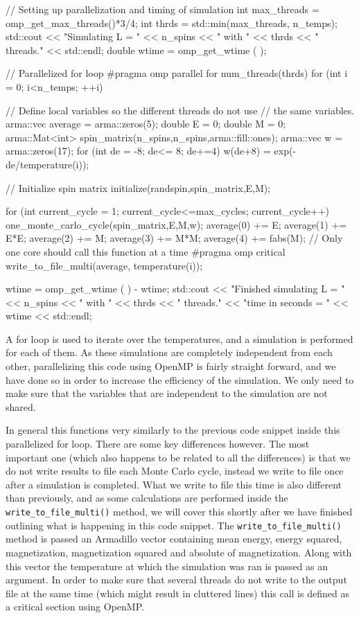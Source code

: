 \documentclass[reprint,english,notitlepage]{revtex4-1}  %
\begin{document}
\begin{cpp}
// Setting up parallelization and timing of simulation
int max_threads = omp_get_max_threads()*3/4;
int thrds = std::min(max_threads, n_temps);
std::cout << "Simulating L = " << n_spins << " with " 
		  << thrds << " threads." << std::endl;
double wtime = omp_get_wtime ( );

// Parallelized for loop
#pragma omp parallel for num_threads(thrds)
for (int i = 0; i<n_temps; ++i) {
  // Define local variables so the different threads do not use 
  // the same variables.
  arma::vec average = arma::zeros(5);
  double E = 0;
  double M = 0;
  arma::Mat<int> spin_matrix(n_spins,n_spins,arma::fill::ones);
  arma::vec w = arma::zeros(17);
  for (int de = -8; de<= 8; de+=4) {
    w(de+8) = exp(-de/temperature(i));
  }

  // Initialize spin matrix
  initialize(randspin,spin_matrix,E,M);

  for (int current_cycle = 1; current_cycle<=max_cycles; 
  	   current_cycle++){
    one_monte_carlo_cycle(spin_matrix,E,M,w);
    average(0) += E;
    average(1) += E*E;
    average(2) += M;
    average(3) += M*M;
    average(4) += fabs(M);
  }
  // Only one core should call this function at a time
  #pragma omp critical
  write_to_file_multi(average, temperature(i));
}
wtime = omp_get_wtime ( ) - wtime;
std::cout << "Finished simulating L = " << n_spins << " with " 
	      << thrds << " threads."
  		  << "\nElapsed time in seconds = " << wtime << std::endl;
\end{cpp} 

A for loop is used to iterate over the temperatures, and a simulation is performed for each of them. As these simulations are completely independent from each other, parallelizing this code using OpenMP is fairly straight forward, and we have done so in order to increase the efficiency of the simulation. We only need to make sure that the variables that are independent to the simulation are not shared. 

In general this functions very similarly to the previous code snippet inside this parallelized for loop. There are some key differences however. The most important one (which also happens to be related to all the differences) is that we do not write results to file each Monte Carlo cycle, instead we write to file once after a simulation is completed. What we write to file this time is also different than previously, and as some calculations are performed inside the \verb+write_to_file_multi()+ method, we will cover this shortly after we have finished outlining what is happening in this code snippet. The \verb+write_to_file_multi()+ method is passed an Armadillo \citep{Armadillo} vector containing mean energy, energy squared, magnetization, magnetization squared and absolute of magnetization. Along with this vector the temperature at which the simulation was ran is passed as an argument. In order to make sure that several threads do not write to the output file at the same time (which might result in cluttered lines) this call is defined as a critical section using OpenMP.
\end{document}
